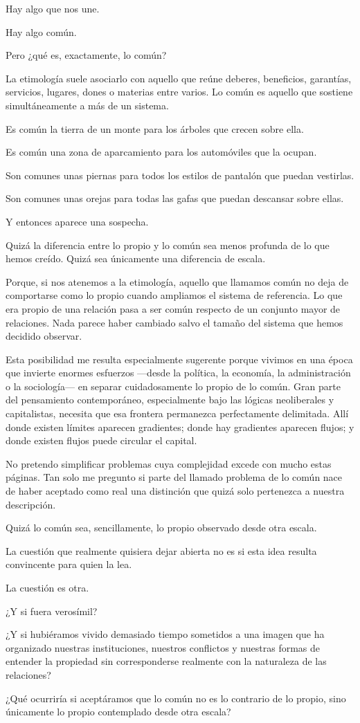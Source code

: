 \documentclass[11pt,a4paper]{article}
\begin{document}
Hay algo que nos une.

Hay algo común.

Pero ¿qué es, exactamente, lo común?

La etimología suele asociarlo con aquello que reúne deberes, beneficios, garantías, servicios, lugares, dones o materias entre varios. Lo común es aquello que sostiene simultáneamente a más de un sistema.

Es común la tierra de un monte para los árboles que crecen sobre ella.

Es común una zona de aparcamiento para los automóviles que la ocupan.

Son comunes unas piernas para todos los estilos de pantalón que puedan vestirlas.

Son comunes unas orejas para todas las gafas que puedan descansar sobre ellas.

Y entonces aparece una sospecha.

Quizá la diferencia entre lo propio y lo común sea menos profunda de lo que hemos creído. Quizá sea únicamente una diferencia de escala.

Porque, si nos atenemos a la etimología, aquello que llamamos común no deja de comportarse como lo propio cuando ampliamos el sistema de referencia. Lo que era propio de una relación pasa a ser común respecto de un conjunto mayor de relaciones. Nada parece haber cambiado salvo el tamaño del sistema que hemos decidido observar.

Esta posibilidad me resulta especialmente sugerente porque vivimos en una época que invierte enormes esfuerzos ---desde la política, la economía, la administración o la sociología--- en separar cuidadosamente lo propio de lo común. Gran parte del pensamiento contemporáneo, especialmente bajo las lógicas neoliberales y capitalistas, necesita que esa frontera permanezca perfectamente delimitada. Allí donde existen límites aparecen gradientes; donde hay gradientes aparecen flujos; y donde existen flujos puede circular el capital.

No pretendo simplificar problemas cuya complejidad excede con mucho estas páginas. Tan solo me pregunto si parte del llamado problema de lo común nace de haber aceptado como real una distinción que quizá solo pertenezca a nuestra descripción.

Quizá lo común sea, sencillamente, lo propio observado desde otra escala.

La cuestión que realmente quisiera dejar abierta no es si esta idea resulta convincente para quien la lea.

La cuestión es otra.

¿Y si fuera verosímil?

¿Y si hubiéramos vivido demasiado tiempo sometidos a una imagen que ha organizado nuestras instituciones, nuestros conflictos y nuestras formas de entender la propiedad sin corresponderse realmente con la naturaleza de las relaciones?

¿Qué ocurriría si aceptáramos que lo común no es lo contrario de lo propio, sino únicamente lo propio contemplado desde otra escala?
\end{document}
